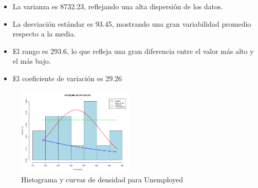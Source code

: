 \documentclass{article}
\begin{document}
\begin{itemize}
\begin{itemize}
\begin{itemize}
                \item La varianza es 8732.23, reflejando una alta dispersión de los datos.
                \item La desviación estándar es 93.45, mostrando una gran variabilidad promedio respecto a la media.
                \item El rango es 293.6, lo que refleja una gran diferencia entre el valor más alto y el más bajo.
                \item El coeficiente de variación es 29.26%
            \end{itemize}
    \end{itemize}

    \begin{figure}[H]
        \centering
        \includegraphics[width=0.5\textwidth]{HistogramasDensidad/histograma_Unemployed.png}
        \caption{Histograma y curvas de densidad para Unemployed}
        \vspace{0.5cm}
    \end{figure}
    

\end{itemize}
\end{document}
